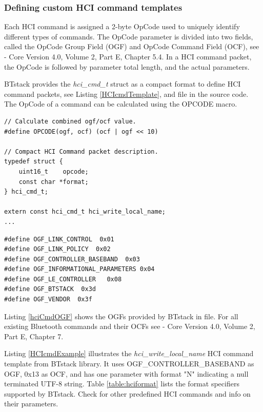\subsubsection{Defining custom HCI command templates}

Each HCI command is assigned a 2-byte OpCode used to uniquely identify different types of commands. The OpCode parameter is divided into two fields, called the OpCode Group Field (OGF) and OpCode Command Field (OCF), see \BluetoothSpecification{} - Core Version 4.0, Volume 2, Part E, Chapter 5.4. In a HCI command packet, the OpCode is followed by parameter total length, and the actual parameters.

BTstack provides the \emph{hci\_cmd\_t} struct as a compact format to define HCI command packets, see Listing \ref{HCIcmdTemplate},  and  file in the source code. The OpCode of a command can be calculated using the OPCODE macro. 


\noindent\begin{minipage}{\textwidth}
\begin{lstlisting}[caption = hci\_cmds.h defines HCI command template., label=HCIcmdTemplate]
// Calculate combined ogf/ocf value.
#define OPCODE(ogf, ocf) (ocf | ogf << 10)

// Compact HCI Command packet description.
typedef struct {
    uint16_t    opcode;
    const char *format;
} hci_cmd_t;

extern const hci_cmd_t hci_write_local_name;
...
\end{lstlisting}
\end{minipage}

\begin{lstlisting}[caption=hci.h defines possible OGFs used for creation of a HCI command., label=hciCmdOGF]
#define OGF_LINK_CONTROL  0x01
#define OGF_LINK_POLICY  0x02
#define OGF_CONTROLLER_BASEBAND  0x03
#define OGF_INFORMATIONAL_PARAMETERS 0x04
#define OGF_LE_CONTROLLER   0x08
#define OGF_BTSTACK  0x3d
#define OGF_VENDOR  0x3f
\end{lstlisting}

Listing \ref{hciCmdOGF} shows the OGFs provided by BTstack in  file.  For all existing Bluetooth commands and their OCFs see \BluetoothSpecificationURL{} - Core Version 4.0, Volume 2, Part E, Chapter 7.

Listing \ref{HCIcmdExample} illustrates the \emph{hci\_write\_local\_name} HCI command template from \mbox{BTstack} library. It uses  OGF\_CONTROLLER\_BASEBAND as OGF, 0x13 as OCF, and has one parameter with format "N" indicating a null terminated UTF-8 string. Table \ref{table:hciformat} lists the format specifiers supported by BTstack. Check  for other predefined HCI commands and info on their parameters.

